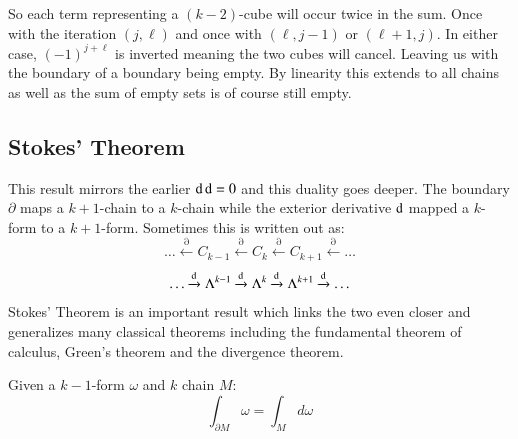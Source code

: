 So each term representing a $(k-2)$-cube will occur twice in the sum.
Once with the iteration $(j,\ell)$ and once with $(\ell, j-1)$ or $(\ell+1, j)$.
In either case, $(-1)^{j+\ell}$ is inverted meaning the two cubes will cancel.
Leaving us with the boundary of a boundary being empty.
By linearity this extends to all chains as well as the sum of empty sets is of course still empty.





%
%
\subsection{Stokes' Theorem}


This result mirrors the earlier $\mathop{}\!\mathrm{d} \mathop{}\!\mathrm{d} = 0$ and this duality goes deeper.
The boundary $\partial$ maps a $k+1$-chain to a $k$-chain while 
the exterior derivative $\mathop{}\!\mathrm{d}$ mapped a $k$-form to a $k+1$-form.
Sometimes this is written out as:
\begin{equation*}
	\ldots 	\xleftarrow{\partial} C_{k-1} 
			\xleftarrow{\partial} C_k 
			\xleftarrow{\partial} C_{k+1} 
			\xleftarrow{\partial} \ldots
\end{equation*}
\begin{equation*}
	\ldots 	\xrightarrow{\mathop{}\!\mathrm{d}} \Lambda^{k-1} 
			\xrightarrow{\mathop{}\!\mathrm{d}} \Lambda^k 
			\xrightarrow{\mathop{}\!\mathrm{d}} \Lambda^{k+1} 
			\xrightarrow{\mathop{}\!\mathrm{d}} \ldots
\end{equation*}
Stokes' Theorem is an important result which links the two even closer and generalizes many classical theorems including
the fundamental theorem of calculus, Green's theorem and the divergence theorem.


Given a $k-1$-form $\omega$ and $k$ chain $M$:
\begin{equation}
	\tag{Stokes' Theorem}
	\int_{\partial M} \omega = \int_M d\omega
\end{equation}


